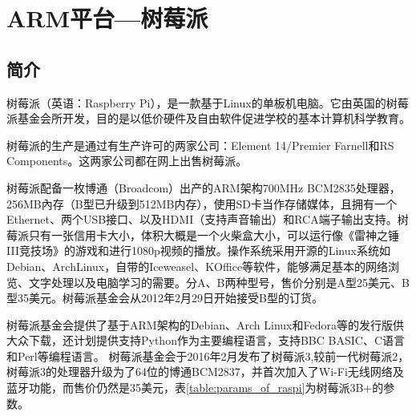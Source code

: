 \chapter{ARM平台---树莓派}
	\section{简介}
		\par 树莓派（英语：Raspberry Pi），是一款基于Linux的单板机电脑。它由英国的树莓派基金会所开发，目的是以低价硬件及自由软件促进学校的基本计算机科学教育。
		\par 树莓派的生产是通过有生产许可的两家公司：Element 14/Premier Farnell和RS Components。这两家公司都在网上出售树莓派。
		\par 树莓派配备一枚博通（Broadcom）出产的ARM架构700MHz BCM2835处理器，256MB內存（B型已升级到512MB内存），使用SD卡当作存储媒体，且拥有一个Ethernet、两个USB接口、以及HDMI（支持声音输出）和RCA端子输出支持。树莓派只有一张信用卡大小，体积大概是一个火柴盒大小，可以运行像《雷神之锤III竞技场》的游戏和进行1080p视频的播放。操作系统采用开源的Linux系统如Debian、ArchLinux，自带的Iceweasel、KOffice等软件，能够满足基本的网络浏览、文字处理以及电脑学习的需要。分A、B两种型号，售价分别是A型25美元、B型35美元。树莓派基金会从2012年2月29日开始接受B型的订货。
		\par 树莓派基金会提供了基于ARM架构的Debian、Arch Linux和Fedora等的发行版供大众下载，还计划提供支持Python作为主要编程语言，支持BBC BASIC、C语言和Perl等编程语言。
		树莓派基金会于2016年2月发布了树莓派3,较前一代树莓派2，树莓派3的处理器升级为了64位的博通BCM2837，并首次加入了Wi-Fi无线网络及蓝牙功能，而售价仍然是35美元，表\ref{table:params_of_raspi}为树莓派3B+的参数。\cite{ wiki:树莓派}
